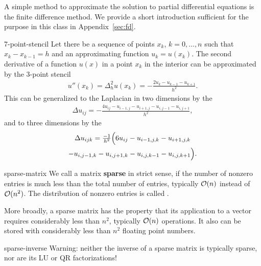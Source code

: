 \begin{intro}
  A simple method to approximate the solution to partial differential
  equations is the finite difference method. We provide a short
  introduction sufficient for the purpose in this class in
  Appendix~\ref{sec:fd}.
\end{intro}

\begin{Example}{7-point-stencil}
  Let there be a sequence of points $x_k$, $k=0,\dots,n$ such that
  $x_k-x_{k-1} = h$ and an approximating function $u_k = u(x_k)$. The
  second derivative of a function $u(x)$ in a point $x_k$ in the
  interior can be approximated by the 3-point stencil
  \begin{gather}
    u''(x_k) = \Delta_h^2 u(x_k) = - \frac{2 u_k - u_{k-1} - u_{k+1}}{h^2}.
  \end{gather}
  This can be generalized to the Laplacian in two dimensions by the 
  \begin{gather}
    \Delta u_{ij} = -\frac{4 u_{ij}- u_{i-1,j} - u_{i+1,j}- u_{i,j-1} - u_{i,j+1}}{h^2},
  \end{gather}
  and to three dimensions by the 
  \begin{multline}
    \Delta u_{ijk} = \tfrac{-1}{h^2}\Bigl(6 u_{ij}
    - u_{i-1,j,k} - u_{i+1,j,k}
    \\
    - u_{i,j-1,k} - u_{i,j+1,k}
    - u_{i,j,k-1} - u_{i,j,k+1}\Bigr).
  \end{multline}
\end{Example}

\begin{Definition}{sparse-matrix}
  We call a matrix \textbf{sparse} in strict
  sense, if the number of nonzero entries is much less than the total
  number of entries, typically $\mathcal O(n)$ instead of $\mathcal O(n^2)$. The
  distribution of nonzero entries is called .

  More broadly, a sparse matrix has the property that its application
  to a vector requires considerably less than $n^2$, typically
  $\mathcal O(n)$ operations. It also can be stored with considerably less
  than $n^2$ floating point numbers.
\end{Definition}

\begin{Remark}{sparse-inverse}
  Warning: neither the inverse of a sparse matrix is typically sparse, nor are
  its LU or QR factorizations!
\end{Remark}

